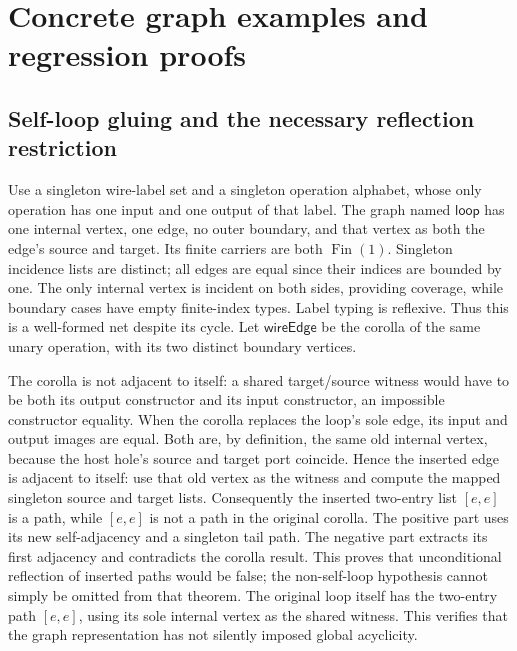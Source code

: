 \section{Concrete graph examples and regression proofs}
\subsection{Self-loop gluing and the necessary reflection restriction}
Use a singleton wire-label set and a singleton operation alphabet, whose only
operation has one input and one output of that label. The graph named
$\mathsf{loop}$ has one internal vertex, one edge, no outer boundary, and that
vertex as both the edge's source and target.
Its finite carriers are both $\operatorname{Fin}(1)$. Singleton incidence lists
are distinct; all edges are equal since their indices are bounded by one. The
only internal vertex is incident on both sides, providing coverage, while
boundary cases have empty finite-index types. Label typing is reflexive. Thus
this is a well-formed net despite its cycle. Let $\mathsf{wireEdge}$ be the
corolla of the same unary operation, with its two distinct boundary vertices.

The corolla is not adjacent to itself: a shared target/source witness would have
to be both its output constructor and its input constructor, an impossible
constructor equality.
When the corolla replaces the loop's sole edge, its input and output images are
equal. Both are, by definition, the same old internal vertex, because the host
hole's source and target port coincide. Hence the inserted edge is adjacent to
itself: use that old vertex as the witness and compute the mapped singleton
source and target lists.
Consequently the inserted two-entry list $[e,e]$ is a path, while $[e,e]$ is not
a path in the original corolla. The positive part uses its new self-adjacency and
a singleton tail path. The negative part extracts its first adjacency and
contradicts the corolla result. This proves that unconditional reflection of
inserted paths would be false; the non-self-loop hypothesis cannot simply be
omitted from that theorem.
The original loop itself has the two-entry path $[e,e]$, using its sole internal
vertex as the shared witness. This verifies that the graph representation has
not silently imposed global acyclicity.

